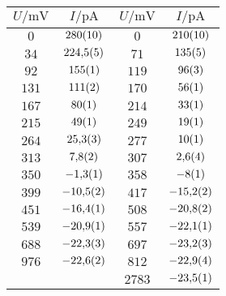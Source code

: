 \begin{table}[H]
{\begin{tabular}{cc||cc}
\hline
$U / \unit{\milli\volt}$ & $I / \unit{\pico\ampere}$ & $U / \unit{\milli\volt}$ & $I / \unit{\pico\ampere}$ \\ 
\hline
$\num{0}$ & $\num{280\pm 10}$ & $\num{0}$ & $\num{210\pm 10}$ \\
$\num{34}$ & $\num{224.5\pm 0.5}$ & $\num{71}$ & $\num{135\pm 5}$ \\
$\num{92}$ & $\num{155\pm 1}$ & $\num{119}$ & $\num{96\pm 3}$ \\
$\num{131}$ & $\num{111\pm 2}$ & $\num{170}$ & $\num{56\pm 1}$ \\
$\num{167}$ & $\num{80\pm 1}$ & $\num{214}$ & $\num{33\pm 1}$ \\
$\num{215}$ & $\num{49\pm 1}$ & $\num{249}$ & $\num{19\pm 1}$ \\
$\num{264}$ & $\num{25.3\pm 0.3}$ & $\num{277}$ & $\num{10\pm 1}$ \\
$\num{313}$ & $\num{7.8\pm 0.2}$ & $\num{307}$ & $\num{2.6\pm 0.4}$ \\
$\num{350}$ & $\num{-1.3\pm 0.1}$ & $\num{358}$ & $\num{-8\pm 1}$ \\
$\num{399}$ & $\num{-10.5\pm 0.2}$ & $\num{417}$ & $\num{-15.2\pm 0.2}$ \\
$\num{451}$ & $\num{-16.4\pm 0.1}$ & $\num{508}$ & $\num{-20.8\pm 0.2}$ \\
$\num{539}$ & $\num{-20.9\pm 0.1}$ & $\num{557}$ & $\num{-22.1\pm 0.1}$ \\
$\num{688}$ & $\num{-22.3\pm 0.3}$ & $\num{697}$ & $\num{-23.2\pm 0.3}$ \\
$\num{976}$ & $\num{-22.6\pm 0.2}$ & $\num{812}$ & $\num{-22.9\pm 0.4}$ \\
   &    & $\num{2783}$ & $\num{-23.5\pm 0.1}$ \\
\hline\end{tabular}
\label{kennlinie_546nm}
}\end{table}